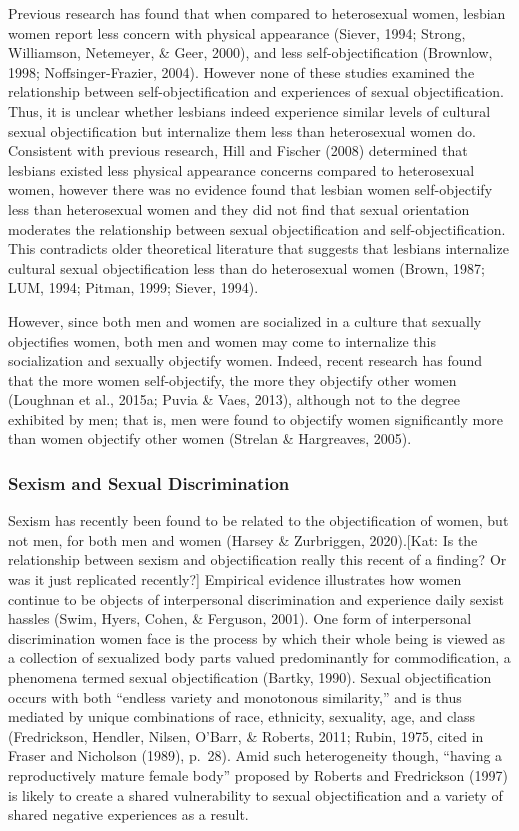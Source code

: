 \documentclass[man]{apa6}
\begin{document}
Previous research has found that when compared to heterosexual women,
lesbian women report less concern with physical appearance (Siever,
1994; Strong, Williamson, Netemeyer, \& Geer, 2000), and less
self-objectification (Brownlow, 1998; Noffsinger-Frazier, 2004). However
none of these studies examined the relationship between
self-objectification and experiences of sexual objectification. Thus, it
is unclear whether lesbians indeed experience similar levels of cultural
sexual objectification but internalize them less than heterosexual women
do. Consistent with previous research, Hill and Fischer (2008)
determined that lesbians existed less physical appearance concerns
compared to heterosexual women, however there was no evidence found that
lesbian women self-objectify less than heterosexual women and they did
not find that sexual orientation moderates the relationship between
sexual objectification and self-objectification. This contradicts older
theoretical literature that suggests that lesbians internalize cultural
sexual objectification less than do heterosexual women (Brown, 1987;
LUM, 1994; Pitman, 1999; Siever, 1994).

However, since both men and women are socialized in a culture that
sexually objectifies women, both men and women may come to internalize
this socialization and sexually objectify women. Indeed, recent research
has found that the more women self-objectify, the more they objectify
other women (Loughnan et al., 2015a; Puvia \& Vaes, 2013), although not
to the degree exhibited by men; that is, men were found to objectify
women significantly more than women objectify other women (Strelan \&
Hargreaves, 2005).

\subsubsection{Sexism and Sexual
Discrimination}\label{sexism-and-sexual-discrimination}

Sexism has recently been found to be related to the objectification of
women, but not men, for both men and women (Harsey \& Zurbriggen,
2020).{[}Kat: Is the relationship between sexism and objectification
really this recent of a finding? Or was it just replicated recently?{]}
Empirical evidence illustrates how women continue to be objects of
interpersonal discrimination and experience daily sexist hassles (Swim,
Hyers, Cohen, \& Ferguson, 2001). One form of interpersonal
discrimination women face is the process by which their whole being is
viewed as a collection of sexualized body parts valued predominantly for
commodification, a phenomena termed sexual objectification (Bartky,
1990). Sexual objectification occurs with both \enquote{endless variety
and monotonous similarity,} and is thus mediated by unique combinations
of race, ethnicity, sexuality, age, and class (Fredrickson, Hendler,
Nilsen, O'Barr, \& Roberts, 2011; Rubin, 1975, cited in Fraser and
Nicholson (1989), p.~28). Amid such heterogeneity though,
\enquote{having a reproductively mature female body} proposed by Roberts
and Fredrickson (1997) is likely to create a shared vulnerability to
sexual objectification and a variety of shared negative experiences as a
result.
\end{document}
